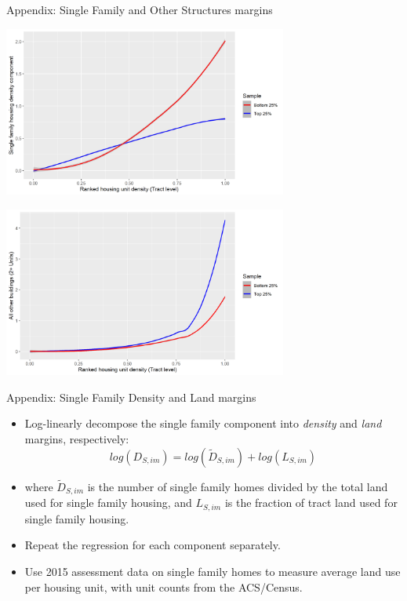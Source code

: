 \documentclass{beamer}
\theoremstyle{plain}
\begin{document}
\begin{frame}{Appendix: Single Family and Other Structures margins 	\hyperlink{return}{} }\label{1}
	\centerline{\includegraphics[width=0.7\textwidth, height=0.5\textheight]{singlefamily_dist.png}}
	\centerline{\includegraphics[width=0.7\textwidth, height=0.5\textheight]{2plusbuilding_dist.png}}

\end{frame}

\begin{frame}{Appendix: Single Family Density and Land margins}
\begin{itemize}
	\itemsep1em
	\color{black}
	\item Log-linearly decompose the single family component into \textit{density} and \textit{land} margins, respectively: 
	\begin{equation}
		log(D_{S, im}) = log(\tilde{D}_{S, im}) + log(L_{S, im})
	\end{equation}
	\item where $\tilde{D}_{S, im}$ is the number of single family homes divided by the total land used for single family housing, and $L_{S, im}$ is the fraction of tract land used for single family housing. 
	\item \color{red} Repeat the regression for each component separately. \color{black}
	\item Use 2015 assessment data on single family homes to measure average land use per housing unit, with unit counts from the ACS/Census.  
\end{itemize}
\end{frame}
\end{document}
